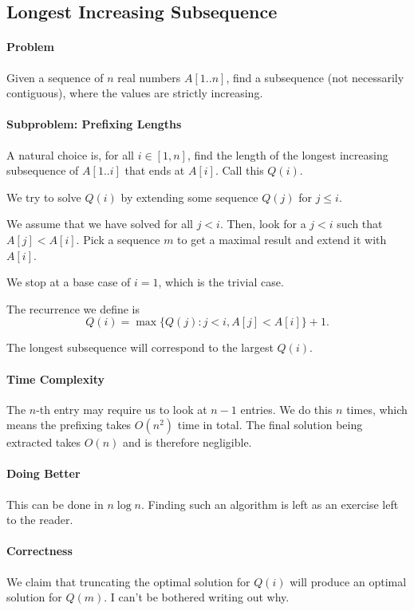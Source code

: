 \subsection{Longest Increasing Subsequence}

\paragraph{Problem}
Given a sequence of \(n\) real numbers  \(A[1..n]\), find a subsequence
(not necessarily contiguous), where the values are strictly increasing.

\paragraph{Subproblem: Prefixing Lengths}
A natural choice is, for all \(i \in [1, n]\), find the length of the
longest increasing subsequence of \(A[1..i]\) that ends at  \(A[i]\).
Call this \(Q(i)\).

We try to solve \(Q(i)\)  by extending some sequence \(Q(j)\) for
\( j \leq i \).

We assume that we have solved for all \(j < i\). Then, look for a  \(j < i\)
such that \(A[j] < A[i]\). Pick a sequence \(m\) to get a maximal result and
extend it with \(A[i]\).

We stop at a base case of \(i = 1\), which is the trivial case.

The recurrence we define is \[
  Q(i) = \max\{Q(j) : j < i, A[j] < A[i]\} + 1
.\] 

The longest subsequence will correspond to the largest \(Q(i)\).

\paragraph{Time Complexity}
The \(n\)-th entry may require us to look at  \(n - 1\) entries.
We do this \(n\) times, which means the prefixing takes \(O(n^2)\)
time in total. The final solution being extracted takes \(O(n)\) and
is therefore negligible.

\paragraph{Doing Better}
This can be done in \(n \log n\). Finding such an algorithm is left as an
exercise left to the reader.

\paragraph{Correctness}
We claim that truncating the optimal solution for \(Q(i)\)
will produce an optimal solution for \(Q(m)\). 
I can't be bothered writing out why.

